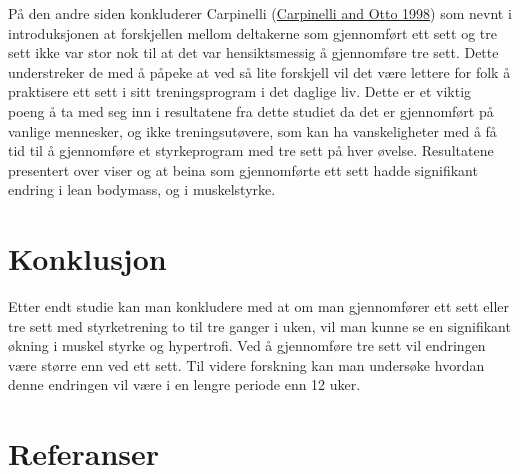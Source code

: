 \documentclass[
]{book}
\begin{document}
På den andre siden konkluderer Carpinelli
(\protect\hyperlink{ref-carpinelli1998}{Carpinelli and Otto 1998}) som
nevnt i introduksjonen at forskjellen mellom deltakerne som gjennomført
ett sett og tre sett ikke var stor nok til at det var hensiktsmessig å
gjennomføre tre sett. Dette understreker de med å påpeke at ved så lite
forskjell vil det være lettere for folk å praktisere ett sett i sitt
treningsprogram i det daglige liv. Dette er et viktig poeng å ta med seg
inn i resultatene fra dette studiet da det er gjennomført på vanlige
mennesker, og ikke treningsutøvere, som kan ha vanskeligheter med å få
tid til å gjennomføre et styrkeprogram med tre sett på hver øvelse.
Resultatene presentert over viser og at beina som gjennomførte ett sett
hadde signifikant endring i lean bodymass, og i muskelstyrke.

\hypertarget{konklusjon}{%
\section{Konklusjon}\label{konklusjon}}

Etter endt studie kan man konkludere med at om man gjennomfører ett sett
eller tre sett med styrketrening to til tre ganger i uken, vil man kunne
se en signifikant økning i muskel styrke og hypertrofi. Ved å
gjennomføre tre sett vil endringen være større enn ved ett sett. Til
videre forskning kan man undersøke hvordan denne endringen vil være i en
lengre periode enn 12 uker.

\hypertarget{referanser-3}{%
\section{Referanser}\label{referanser-3}}
\end{document}
